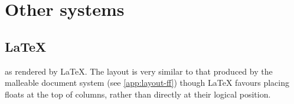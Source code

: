 \clearpage


\section{Other systems}
\label{app:layout-other}

\subsection{\LaTeX}

\cite{Pinkney2011} as rendered by \LaTeX. The layout is very similar to that produced by the malleable document system (see \ref{app:layout-ff}) though \LaTeX{} favours placing floats at the top of columns, rather than directly at their logical position.

\begin{center}
\setlength{\imgwid}{0.47\textwidth}
\hspace{0.01\textwidth}

\end{center}
